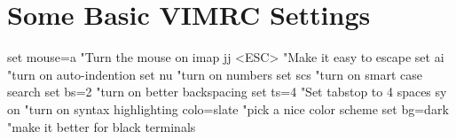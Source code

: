 \section{Some Basic VIMRC Settings}
\begin{multicols}{2}
\begin{code}
set mouse=a "Turn the mouse on 
imap jj <ESC> "Make it easy to escape
set ai "turn on auto-indention
set nu "turn on numbers
set scs "turn on smart case search
set bs=2 "turn on better backspacing
set ts=4 "Set tabstop to 4 spaces
sy on "turn on syntax highlighting
colo=slate "pick a nice color scheme
set bg=dark "make it better for black terminals
\end{code}
\end{multicols}
